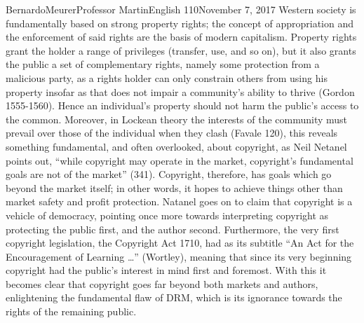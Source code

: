\documentclass[12pt,letterpaper]{article}
\begin{document}
\begin{mla}{Bernardo}{Meurer}{Professor Martin}{English 110}{November 7, 2017}
        Western society is fundamentally based on strong property rights; the concept of appropriation and the enforcement of said rights are the basis of modern capitalism. Property rights grant the holder a range of privileges (transfer, use, and so on), but it also grants the public a set of complementary rights, namely some protection from a malicious party, as a rights holder can only constrain others from using his property insofar as that does not impair a community's ability to thrive (Gordon 1555-1560). Hence an individual's property should not harm the public's access to the common. Moreover, in Lockean theory the interests of the community must prevail over those of the individual when they clash (Favale 120), this reveals something fundamental, and often overlooked, about copyright, as Neil Netanel points out, ``while copyright may operate in the market, copyright's fundamental goals are not of the market'' (341). Copyright, therefore, has goals which go beyond the market itself; in other words, it hopes to achieve things other than market safety and profit protection. Natanel goes on to claim that copyright is a vehicle of democracy, pointing once more towards interpreting copyright as protecting the public first, and the author second. Furthermore, the very first copyright legislation, the Copyright Act 1710, had as its subtitle ``An Act for the Encouragement of Learning \ldots'' (Wortley), meaning that since its very beginning copyright had the public's interest in mind first and foremost. With this it becomes clear that copyright goes far beyond both markets and authors, enlightening the fundamental flaw of DRM, which is its ignorance towards the rights of the remaining public.


\end{mla}
\end{document}
